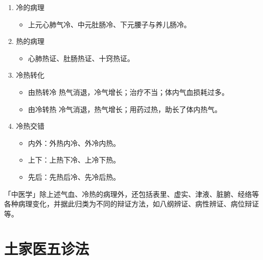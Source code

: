\documentclass[cn,hazy,blue,12pt,normal,founder]{elegantnote}
\begin{document}
\begin{enumerate}
  \item 冷的病理
  \begin{itemize}
    \item 上元心肺气冷、中元肚肠冷、下元腰子与养儿肠冷。
  \end{itemize}

  \item 热的病理
  \begin{itemize}
    \item 心肺热证、肚肠热证、十窍热证。
  \end{itemize}

  \item 冷热转化
  \begin{itemize}
    \item 由热转冷
    \subitem 热气消退，冷气增长；治疗不当；体内气血损耗过多。
    \item 由冷转热
    \subitem 冷气消退，热气增长；用药过热，助长了体内热气。
  \end{itemize}
  \item 冷热交错
  \begin{itemize}
    \item 内外：外热内冷、外冷内热。
    \item 上下：上热下冷、上冷下热。
    \item 先后：先热后冷、先冷后热。
  \end{itemize}
\end{enumerate}

\begin{note}
  「中医学」除上述气血、冷热的病理外，还包括表里、虚实、津液、脏腑、经络等各种病理变化，并据此归类为不同的辩证方法，如八纲辨证、病性辨证、病位辩证等。
\end{note}

\section{土家医五诊法}
\end{document}
